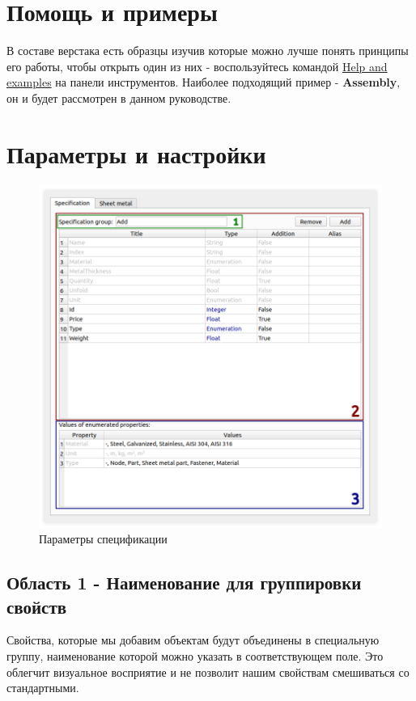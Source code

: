 \documentclass[a4paper,12pt]{article}
\begin{document}


\section{Помощь и примеры}
В составе верстака есть образцы изучив которые можно лучше понять принципы его работы, чтобы открыть один из них - воспользуйтесь командой \hyperref[sec:8]{Help and examples} на панели инструментов. Наиболее подходящий пример - \textbf{Assembly}, он и будет рассмотрен в данном руководстве.

\pagebreak



\section{Параметры и настройки}
\begin{figure}[htp]
\centering
\includegraphics[width=1.0\textwidth]{img/pref_specification.png}
\caption{Параметры спецификации}
\label{sec:pref_specification}
\end{figure}

\subsection{Область 1 - Наименование для группировки свойств}
Свойства, которые мы добавим объектам будут объединены в специальную группу, наименование которой можно указать в соответствующем поле. Это облегчит визуальное восприятие и не позволит нашим свойствам смешиваться со стандартными.
\end{document}
